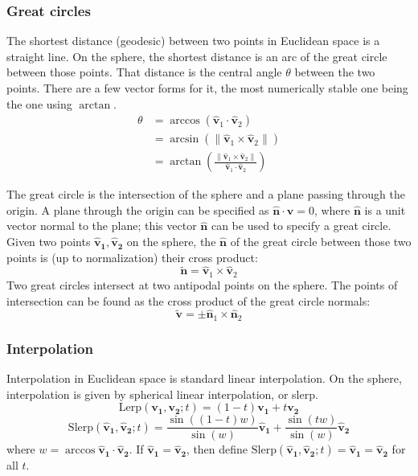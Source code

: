 \documentclass{amsart}[12pt]
\begin{document}
\subsubsection{Great circles}
The shortest distance (geodesic) between two points in Euclidean space is a
straight line. On the sphere, the shortest distance is an arc of the great
circle between those points. That distance is the central angle $\theta$
between the two points. There are a few vector forms for it, the most
numerically stable one being the one using $\arctan$.
\begin{equation}\begin{split}
\theta &= \arccos \left(\mathbf{\hat{v}}_1 \cdot \mathbf{\hat{v}}_2\right) \\
&= \arcsin \left(\|\mathbf{\hat{v}}_1 \times \mathbf{\hat{v}}_2\| \right) \\
&= \arctan \left( \frac{\|\mathbf{\hat{v}}_1 \times \mathbf{\hat{v}}_2\|}
  {\mathbf{\hat{v}}_1 \cdot \mathbf{\hat{v}}_2} \right)
\end{split}\end{equation}

The great circle is the intersection of the sphere
and a plane passing through the origin. A plane through the origin can be
specified as $\hat{\mathbf n} \cdot \mathbf v = 0$, where $\hat{\mathbf n}$ is
a unit vector normal to the plane; this vector $\hat{\mathbf n}$ can be used to
specify a great circle. Given two points $\mathbf{\hat{v}_1, \hat{v}_2}$ on the
sphere, the $\hat{\mathbf n}$ of the great circle between those two points is
(up to normalization) their cross product:
\begin{equation}
  \mathbf{\widetilde{n}} = \mathbf{\hat{v}}_1 \times \mathbf{\hat{v}}_2
\end{equation}
Two great circles intersect at two antipodal points on the sphere. The points
of intersection can be found as the cross product of the great circle normals:
\begin{equation}
  \mathbf{\widetilde{v}} = \pm \mathbf{\hat{n}}_1 \times \mathbf{\hat{n}}_2
\end{equation}

\subsubsection{Interpolation}
Interpolation in Euclidean space is standard linear interpolation. On the
sphere, interpolation is given by spherical linear interpolation, or slerp.
\begin{equation}
\mathrm{Lerp}(\mathbf{v_1}, \mathbf{v_2}; t) =
       (1-t) \mathbf{v_1} + t \mathbf{v_2}
\end{equation}
\begin{equation}
\mathrm{Slerp}(\mathbf{\hat{v}_1}, \mathbf{\hat{v}_2}; t) =
        \frac{\sin ((1-t)w)}{\sin (w)} \mathbf{\hat{v}_1} +
       \frac{\sin (tw)}{\sin (w)} \mathbf{\hat{v}_2}
\end{equation}
where $w = \arccos \mathbf{\hat{v}_1} \cdot \mathbf{\hat{v}_2}$. If $\mathbf{\hat{v}_1} = \mathbf{\hat{v}_2}$, then define $\mathrm{Slerp}(\mathbf{\hat{v}_1}, \mathbf{\hat{v}_2}; t) =
\mathbf{\hat{v}_1} = \mathbf{\hat{v}_2}$ for all $t$.
\end{document}
